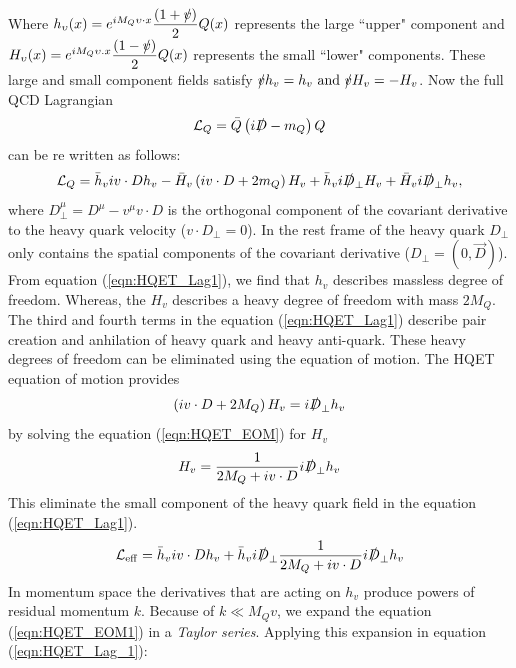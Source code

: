 Where $h_{\upsilon}(x)=e^{iM_{Q}\upsilon\cdot x}\dfrac{(1+\slashed{\upsilon})}{2}Q(x)$ represents the large ``upper" component and $H_{\upsilon}(x)=e^{iM_{Q}\upsilon.x}\dfrac{(1-\slashed{\upsilon})}{2}Q(x)$ represents the small ``lower" components. These large and small component fields satisfy $\slashed{v} h_{v}=h_{v} \text { and } \slashed{v} H_{v}=-H_v$. Now the full QCD Lagrangian
\begin{eqnarray}
\mathcal{L}_{Q}=\bar{Q}\left(i \slashed{ D}-m_{Q}\right) Q
\end{eqnarray} 
can be re written as follows:
\begin{eqnarray}\label{eqn:HQET_Lag1}
\mathcal{L}_{Q}=\bar{h}_{v} i v \cdot D h_{v}-\bar{H}_{v}\left(i v \cdot D+2 m_{Q}\right) H_{v}+\bar{h}_{v} i \slashed{D}_{\perp} H_{v}+\bar{H}_{v} i \slashed{D}_{\perp} h_{v},
\end{eqnarray}
where $D_{\perp}^{\mu}=D^{\mu}-v^{\mu} v \cdot D$ is the orthogonal component of the covariant derivative to the heavy quark velocity ($v \cdot D_{\perp}=0$). In the rest frame of the heavy quark $D_{\perp}$ only contains the spatial components of the covariant derivative ($D_{\perp}=(0, \vec{D})$).
From equation (\ref{eqn:HQET_Lag1}), we find that $h_{v}$ describes massless degree of freedom. Whereas, the $H_{v}$ describes a heavy degree of freedom with mass $2M_Q$. The third and fourth terms in the equation (\ref{eqn:HQET_Lag1}) describe pair creation and anhilation of heavy quark and heavy anti-quark. These heavy degrees of freedom can be eliminated using the equation of motion. The HQET equation of motion provides
\begin{eqnarray}\label{eqn:HQET_EOM}
\left(i v \cdot D+2 M_{Q}\right) H_{v}=i \slashed{ D}_{\perp} h_{v}
\end{eqnarray}
by solving the equation (\ref{eqn:HQET_EOM}) for $H_{v}$ 
\begin{eqnarray}\label{eqn:HQET_EOM1}
H_{v}=\frac{1}{2 M_{Q}+i v \cdot D} i \slashed{ D}_{\perp} h_{v}
\end{eqnarray} 
This eliminate the small component of the heavy quark field in the equation (\ref{eqn:HQET_Lag1}).
\begin{eqnarray}\label{eqn:HQET_Lag_1}
\mathcal{L}_{\mathrm{eff}}=\bar{h}_{v} i v \cdot D h_{v}+\bar{h}_{v} i \slashed{ D}_{\perp} \frac{1}{2 M_{Q}+i v \cdot D} i \slashed{ D}_{\perp} h_{v}
\end{eqnarray} 
In momentum space the derivatives that are acting on $h_v$ produce powers of residual momentum $k$. Because of $k\ll M_{Q}v$, we expand the equation (\ref{eqn:HQET_EOM1}) in a \textit{Taylor series}. Applying this expansion in equation (\ref{eqn:HQET_Lag_1}):
